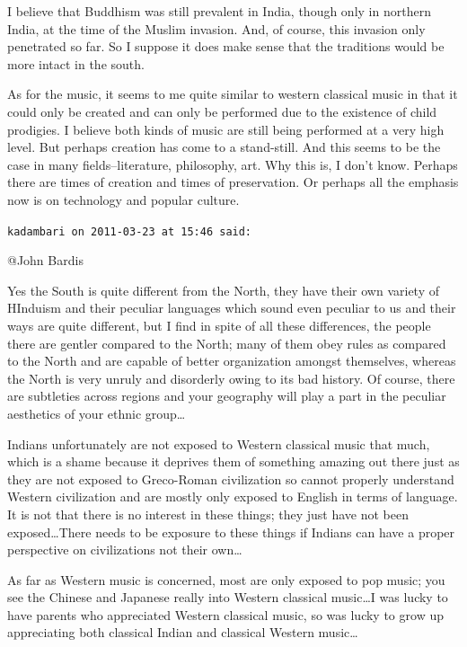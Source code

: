 \begin{footnotesize}
\begin{sffamily}
I believe that Buddhism was still prevalent in India, though only in northern India, at the time of the Muslim invasion. And, of course, this invasion only penetrated so far. So I suppose it does make sense that the traditions would be more intact in the south.

As for the music, it seems to me quite similar to western classical music in that it could only be created and can only be performed due to the existence of child prodigies. I believe both kinds of music are still being performed at a very high level. But perhaps creation has come to a stand-still. And this seems to be the case in many fields–literature, philosophy, art. Why this is, I don't know. Perhaps there are times of creation and times of preservation. Or perhaps all the emphasis now is on technology and popular culture.


\hfill

\texttt{kadambari on 2011-03-23 at 15:46 said: }

@John Bardis

Yes the South is quite different from the North, they have their own variety of HInduism and their peculiar languages which sound even peculiar to us and their ways are quite different, but I find in spite of all these differences, the people there are gentler compared to the North; many of them obey rules as compared to the North and are capable of better organization amongst themselves, whereas the North is very unruly and disorderly owing to its bad history. Of course, there are subtleties across regions and your geography will play a part in the peculiar aesthetics of your ethnic group…

Indians unfortunately are not exposed to Western classical music that much, which is a shame because it deprives them of something amazing out there just as they are not exposed to Greco-Roman civilization so cannot properly understand Western civilization and are mostly only exposed to English in terms of language. It is not that there is no interest in these things; they just have not been exposed…There needs to be exposure to these things if Indians can have a proper perspective on civilizations not their own…

As far as Western music is concerned, most are only exposed to pop music; you see the Chinese and Japanese really into Western classical music…I was lucky to have parents who appreciated Western classical music, so was lucky to grow up appreciating both classical Indian and classical Western music…


\end{sffamily}
\end{footnotesize}
